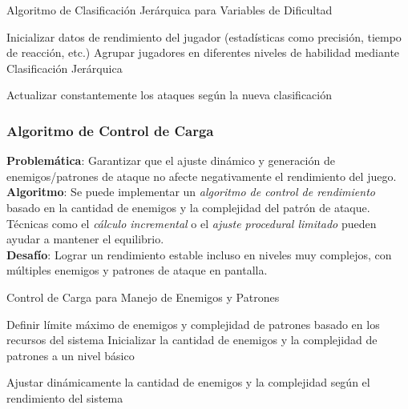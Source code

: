\begin{algorithm}[H]
\caption{Algoritmo de Clasificación Jerárquica para Variables de Dificultad}
\SetAlgoLined

Inicializar datos de rendimiento del jugador (estadísticas como precisión, tiempo de reacción, etc.)\;
Agrupar jugadores en diferentes niveles de habilidad mediante Clasificación Jerárquica\;


Actualizar constantemente los ataques según la nueva clasificación\;
\end{algorithm}

\subsubsection*{Algoritmo de Control de Carga}
\textbf{Problemática}: Garantizar que el ajuste dinámico y generación de enemigos/patrones de ataque no afecte negativamente el rendimiento del juego.\\
\textbf{Algoritmo}: Se puede implementar un \textit{algoritmo de control de rendimiento} basado en la cantidad de enemigos y la complejidad del patrón de ataque. Técnicas como el \textit{cálculo incremental} o el \textit{ajuste procedural limitado} pueden ayudar a mantener el equilibrio.\\
\textbf{Desafío}: Lograr un rendimiento estable incluso en niveles muy complejos, con múltiples enemigos y patrones de ataque en pantalla.

\begin{algorithm}[H]
\caption{Control de Carga para Manejo de Enemigos y Patrones}
\SetAlgoLined

Definir límite máximo de enemigos y complejidad de patrones basado en los recursos del sistema\;
Inicializar la cantidad de enemigos y la complejidad de patrones a un nivel básico\;


Ajustar dinámicamente la cantidad de enemigos y la complejidad según el rendimiento del sistema\;

\end{algorithm}

